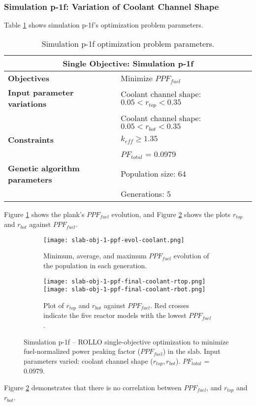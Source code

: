 \subsubsection{Simulation p-1f: Variation of Coolant Channel Shape}
Table \ref{tab:simulationp1f} shows simulation p-1f's optimization problem parameters. 
\begin{table}[htbp!]
    \centering
    \onehalfspacing
    \caption{Simulation p-1f optimization problem parameters.}
	\label{tab:simulationp1f}
    \footnotesize
    \begin{tabular}{l|p{6.5cm}}
    \hline 
    \multicolumn{2}{c}{\textbf{Single Objective: Simulation p-1f}} \\
    \hline 
    \textbf{Objectives} & Minimize $PPF_{fuel}$ \\
    \hline 
    \textbf{Input parameter variations} 
    & Coolant channel shape: $0.05<r_{top}<0.35$ \\
    & Coolant channel shape: $0.05<r_{bot}<0.35$ \\
    \hline
    \textbf{Constraints} & $k_{eff} \geq 1.35$\\ 
    & $PF_{total}$ = 0.0979\\
    \hline 
    \textbf{Genetic algorithm parameters} & Population size: 64 \\
    & Generations: 5 \\
    \hline
    \end{tabular}
\end{table}
Figure \ref{fig:slab-obj-1-ppf-evol-coolant} shows the plank's $PPF_{fuel}$ evolution, 
and Figure \ref{fig:slab-obj-1-ppf-final-coolant} shows the plots $r_{top}$ and 
$r_{bot}$ against $PPF_{fuel}$. 
\begin{figure}[htbp!]
    \centering
    \begin{subfigure}{\textwidth}
        \texttt{[image: slab-obj-1-ppf-evol-coolant.png]}
        \caption{Minimum, average, and maximum $PPF_{fuel}$ evolution of the 
        population in each generation.}
        \label{fig:slab-obj-1-ppf-evol-coolant} 
    \end{subfigure}
    \begin{subfigure}{\textwidth}
        \texttt{[image: slab-obj-1-ppf-final-coolant-rtop.png]}
        \texttt{[image: slab-obj-1-ppf-final-coolant-rbot.png]}
        \caption{Plot of $r_{top}$ and $r_{bot}$ against $PPF_{fuel}$. 
        Red crosses indicate the five reactor models with the lowest $PPF_{fuel}$.}
        \label{fig:slab-obj-1-ppf-final-coolant} 
    \end{subfigure}
    \caption{Simulation p-1f -- ROLLO single-objective optimization to minimize 
    fuel-normalized power peaking factor ($PPF_{fuel}$) in the slab. 
    Input parameters varied: coolant channel shape ($r_{top}, r_{bot}$). 
    $PF_{total}$ = 0.0979.}
    \label{fig:slab-obj-1-ppf-coolant}
\end{figure}
Figure \ref{fig:slab-obj-1-ppf-final-coolant} demonstrates that there is no correlation 
between $PPF_{fuel}$, and $r_{top}$ and $r_{bot}$. 

